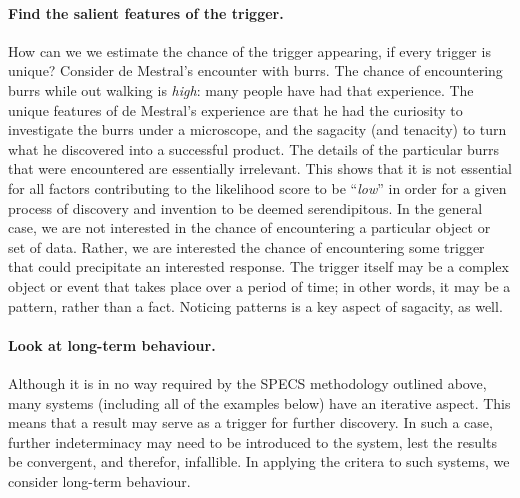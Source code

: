 \paragraph{Find the salient features of the trigger.} How can we
we estimate the chance of the trigger appearing, if every trigger is
unique?  Consider de Mestral's encounter with burrs.  The chance of
encountering burrs while out walking is \emph{high}: many people have
had that experience.  The unique features of de Mestral's experience
are that he had the curiosity to investigate the burrs under a
microscope, and the sagacity (and tenacity) to turn what he discovered
into a successful product.  The details of the particular burrs that
were encountered are essentially irrelevant.  This shows that it is
not essential for all factors contributing to the likelihood score to
be ``\emph{low}'' in order for a given process of discovery and
invention to be deemed serendipitous.  In the general case, we are not
interested in the chance of encountering a particular object or set of
data.  Rather, we are interested the chance of encountering some
trigger that could precipitate an interested response.  The trigger
itself may be a complex object or event that takes place over a period
of time; in other words, it may be a pattern, rather than a fact.
Noticing patterns is a key aspect of sagacity, as well.

\paragraph{Look at long-term behaviour.}  Although it is in no way
required by the SPECS methodology outlined above, many systems
(including all of the examples below) have an iterative aspect.  This
means that a result may serve as a trigger for further discovery.  In
such a case, further indeterminacy may need to be introduced to the
system, lest the results be convergent, and therefor, infallible.  In
applying the critera to such systems, we consider long-term behaviour.


